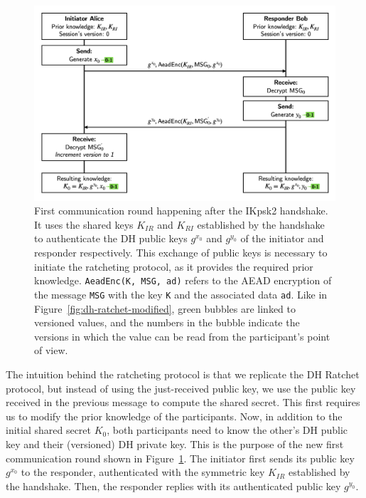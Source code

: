 \begin{figure}
    \centering
    \includegraphics[width=1.0\textwidth]{figures/DH-ratchet-modified-first.png}
    \caption{First communication round happening after the IKpsk2 handshake.
    It uses the shared keys $K_{IR}$ and $K_{RI}$ established by the handshake to authenticate the DH public keys $g^{x_0}$ and $g^{y_0}$ of the initiator and responder respectively.
    This exchange of public keys is necessary to initiate the ratcheting protocol, as it provides the required prior knowledge.
    \texttt{AeadEnc(K, MSG, ad)} refers to the AEAD encryption of the message \texttt{MSG} with the key \texttt{K} and the associated data \texttt{ad}.
    Like in Figure~\ref{fig:dh-ratchet-modified}, green bubbles are linked to versioned values, and the numbers in the bubble indicate the versions in which the value can be read from the participant's point of view.
    }
    \label{fig:dh-ratchet-modified-first}
\end{figure}

The intuition behind the ratcheting protocol is that we replicate the DH Ratchet protocol, but instead of using the just-received public key, we use the public key received in the previous message to compute the shared secret.
This first requires us to modify the prior knowledge of the participants. Now, in addition to the initial shared secret $K_0$, both participants need to know the other's DH public key and their (versioned) DH private key.
This is the purpose of the new first communication round shown in Figure~\ref{fig:dh-ratchet-modified-first}. 
The initiator first sends its public key $g^{x_0}$ to the responder, authenticated with the symmetric key $K_{IR}$ established by the handshake. Then, the responder replies with its authenticated public key $g^{y_0}$.

